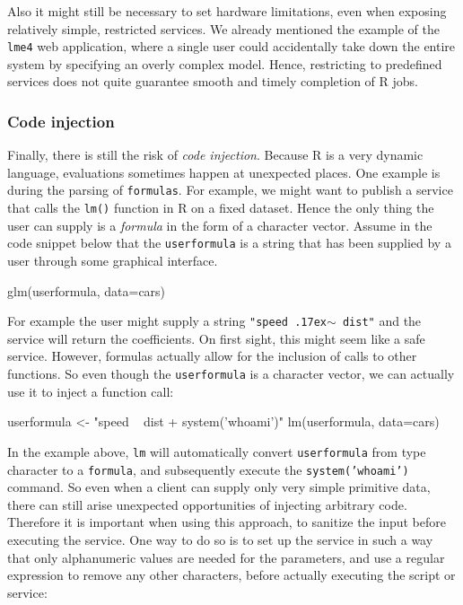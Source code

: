 \documentclass[article]{jss}
\newcommand{\R}{\textsf{R}\xspace}
\begin{document}
Also it might still be necessary to set hardware limitations, even when exposing
relatively simple, restricted services. We already mentioned the example of the
\texttt{lme4} web application, where a single user could accidentally take down
the entire system by specifying an overly complex model. Hence, restricting to
predefined services does not quite guarantee smooth and timely completion of
\R jobs.

\subsubsection{Code injection}

Finally, there is still the risk of \emph{code injection}. Because \R
is a very dynamic language, evaluations sometimes happen at unexpected places.
One example is during the parsing of \texttt{formulas}. For example, we might
want to publish a service that calls the \texttt{lm()} function in \R
on a fixed dataset. Hence the only thing the user can supply is a \emph{formula}
in the form of a character vector. Assume in the code snippet below that
the \texttt{userformula} is a string that has been supplied by a user through
some graphical interface.

\begin{CodeChunk}
\begin{CodeInput}
glm(userformula, data=cars)
\end{CodeInput}
\end{CodeChunk}

For example the user might supply a string \texttt{"speed
{\raise.17ex\hbox{$\scriptstyle\sim$}} dist"} and the service will return the
coefficients. On first sight, this might seem like a safe service. However,
formulas actually allow for the inclusion of calls to other functions. So even though the \texttt{userformula} is a character vector, we can actually use it to inject a
function call:

\begin{CodeChunk}
\begin{CodeInput}
userformula <- "speed ~ dist + system('whoami')"
lm(userformula, data=cars)
\end{CodeInput}
\end{CodeChunk}

In the example above, \texttt{lm} will automatically convert
\texttt{userformula} from type character to a \texttt{formula}, and
subsequently execute the \texttt{system('whoami')} command. So even when a
client can supply only very simple primitive data, there can still arise
unexpected opportunities of injecting arbitrary code. Therefore it is important
when using this approach, to sanitize the input before executing the service.
One way to do so is to set up the service in such a way that only alphanumeric
values are needed for the parameters, and use a regular expression to remove
any other characters, before actually executing the script or service:
\end{document}
